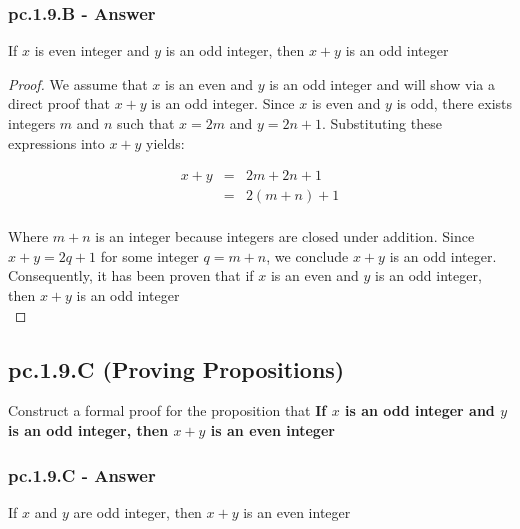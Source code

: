 \subsubsection*{pc.1.9.B - Answer}

\begin{tcolorbox}
\begin{theorem}
If $x$ is even integer and $y$ is an odd integer, then $x + y$ is an odd integer
\end{theorem}
\end{tcolorbox}

\begin{proof}

We assume that $x$ is an even and $y$ is an odd integer and will show via a direct proof that $x + y$ is an odd integer. Since $x$ is even and $y$ is odd, there exists integers $m$ and $n$ such that $x = 2m$ and $y = 2n + 1$. Substituting these expressions into $x + y$ yields:

\begin{eqnarray*}
x + y & = & 2m + 2n + 1 \nonumber \\
& = & 2(m + n) + 1 \nonumber \\
\end{eqnarray*}

Where $m + n$ is an integer because integers are closed under addition. Since $x + y = 2q + 1$ for some integer $q = m + n$, we conclude $x + y$ is an odd integer. Consequently, it has been proven that if $x$ is an even and $y$ is an odd integer, then $x + y$ is an odd integer \\

\end{proof}


\newpage
\subsection{pc.1.9.C (Proving Propositions)}

Construct a formal proof for the proposition that {\bf If $x$ is an odd integer and $y$ is an odd integer, then $x + y$ is an even integer}

\subsubsection*{pc.1.9.C - Answer}

\begin{tcolorbox}
\begin{theorem}
If $x$ and $y$ are odd integer, then $x + y$ is an even integer
\end{theorem}
\end{tcolorbox}

